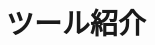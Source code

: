 \documentclass[10pt,a4j,openany,dvipdfmx]{jsbook}
\begin{document}
\appendix
\chapter{ツール紹介} %
\label{cha:ツール紹介}


\end{document}
